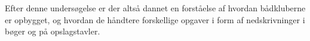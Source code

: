 Efter denne undersøgelse er der altså dannet en forståelse af hvordan bådkluberne er opbygget, og hvordan de håndtere
forskellige opgaver i form af nedskrivninger i bøger og på opslagstavler.

%
\cbend
